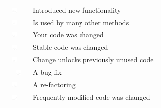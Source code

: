 \documentclass[12pt,oneside]{book}
\begin{document}
\begin{table}[t!]
\begin{tabular}{ll}
\vspace{-2pt}\includegraphics[height=10px, width=30px]{figures/sparkles/change-introduced-new-functionality.pdf} & Introduced new functionality\\
\vspace{-2pt}\includegraphics[height=10px, width=30px]{figures/sparkles/code-is-used-by-many-other-methods.pdf} & Is used by many other methods\\
\vspace{-2pt}\includegraphics[height=10px, width=30px]{figures/sparkles/your-code-was-changed.pdf} & Your code was changed \\
\vspace{-2pt}\includegraphics[height=10px, width=30px]{figures/sparkles/stable-code-was-changed.pdf} & Stable code was changed\\
\vspace{-2pt}\includegraphics[height=10px, width=30px]{figures/sparkles/change-unlocks-previously-unused-code.pdf} & Change unlocks previously unused code\\\
\vspace{-2pt}\includegraphics[height=10px, width=30px]{figures/sparkles/change-was-a-bug-fix.pdf} & A bug fix\\	
\vspace{-2pt}\includegraphics[height=10px, width=30px]{figures/sparkles/change-was-a-re-factoring.pdf} & A re-factoring\\ 
\vspace{-2pt}\includegraphics[height=10px, width=30px]{figures/sparkles/frequently-modified-code-was-changed.pdf} & Frequently modified code was changed \\

\end{tabular}
\end{table}
\end{document}
